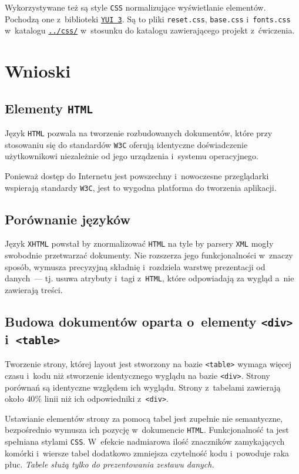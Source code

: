 \documentclass[10pt,a4paper]{article}
\newcommand{\f}[1]{\texttt{#1}}
\begin{document}
Wykorzystywane też są style \f{CSS} normalizujące wyświetlanie elementów.
Pochodzą one z~biblioteki \f{\href{http://yuilibrary.com/}{YUI 3}}. Są to pliki
\f{reset.css}, \f{base.css} i~\f{fonts.css} w~katalogu
\f{\href{https://github.com/student-tomasz/pi-laboratoria/tree/master/css}{../css/}}
w~stosunku do katalogu zawierającego projekt z~ćwiczenia.

\section{Wnioski}
\subsection{Elementy \f{HTML}}
Język \f{HTML} pozwala na tworzenie rozbudowanych dokumentów, które przy
stosowaniu się do standardów \f{W3C} oferują identyczne doświadczenie
użytkownikowi niezależnie od jego urządzenia i~systemu operacyjnego.

Ponieważ dostęp do Internetu jest powszechny i~nowoczesne przeglądarki wspierają
standardy \f{W3C}, jest to wygodna platforma do tworzenia aplikacji.

\subsection{Porównanie języków}
Język \f{XHTML} powstał by znormalizować \f{HTML} na tyle by parsery \f{XML}
mogły swobodnie przetwarzać dokumenty. Nie rozszerza jego funkcjonalności
w~znaczy sposób, wymusza precyzyjną składnię i~rozdziela warstwę prezentacji
od danych~--- tj. usuwa atrybuty i~tagi z~\f{HTML}, które odpowiadają za wygląd
a~nie zawierają treści.

\subsection{Budowa dokumentów oparta o~elementy \f{<div>} i~\f{<table>}}
Tworzenie strony, której layout jest stworzony na bazie \f{<table>} wymaga
więcej czasu i~kodu niż stworzenie identycznego wyglądu na bazie \f{<div>}.
Strony porównań są identyczne względem ich wyglądu. Strony z~tabelami zawierają
około $40\%$ linii niż ich odpowiedniki z~\f{<div>}.

Ustawianie elementów strony za pomocą tabel jest zupełnie nie semantyczne,
bezpośrednio wymusza ich pozycję w~dokumencie \f{HTML}. Funkcjonalność ta jest
spełniana stylami \f{CSS}. W~efekcie nadmiarowa ilość znaczników zamykających
komórki i~wiersze tabel dodatkowo zmniejsza czytelność kodu i~powoduje raka
płuc. \emph{Tabele służą tylko do prezentowania zestawu danych.}
\end{document}
